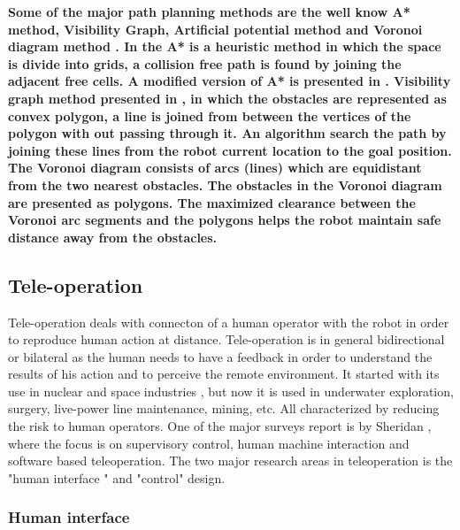 \textbf{Some of the major path planning methods are the well know \textbf{A*} method, Visibility Graph, Artificial potential method and  Voronoi diagram method \cite{garrido2006voronoi}. In the A* \cite{latombe2012robot} is a heuristic method in which the space is divide into grids, a collision  free path is found by joining the adjacent free cells. A modified version of A* is presented in \cite{duchovn2014path}.
Visibility graph method presented in \cite{nilsson1969mobile}, in which the obstacles are represented as convex polygon, a line is joined from between the vertices of the polygon with out passing through it. An algorithm search the path by joining these lines from the robot current location to the goal position.
The Voronoi diagram \cite{latombe2012robot, bhattacharya2008roadmap, takahashi1989motion} consists of arcs (lines) which are equidistant from the two nearest obstacles. The obstacles in the Voronoi diagram are presented as polygons.
The maximized clearance between the Voronoi arc segments and the polygons helps the robot maintain safe distance away from the obstacles.  }
\subsection{Tele-operation}
Tele-operation deals with  connecton of a   human operator with the robot in order to reproduce human action at distance. Tele-operation is in general bidirectional or bilateral as the human needs to have a feedback in order to understand the results of his action and to perceive the remote environment. It started with its use in nuclear and space industries \cite{martin1985teleoperated,vertut1986teleoperations}, but now it is used in underwater exploration, surgery, live-power line maintenance, mining, etc. All characterized by reducing the risk to human operators. One of the major surveys report is by Sheridan \cite{sheridan}, where the focus is on supervisory control, human machine interaction and software based teleoperation.  The two major research areas in teleoperation is the "human interface " and "control" design.
\subsubsection{Human interface}

